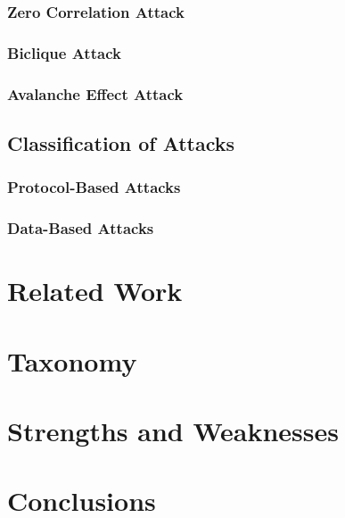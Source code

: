 \documentclass[conference,compsoc]{IEEEtran}
\begin{document}
\subsubsection{Zero Correlation Attack} 
\subsubsection{Biclique Attack} 
\subsubsection{Avalanche Effect Attack} 
\subsection{Classification of Attacks}
\subsubsection{Protocol-Based Attacks} 
\subsubsection{Data-Based Attacks} 

\section{Related Work}

\section{Taxonomy}

\section{Strengths and Weaknesses}

\section{Conclusions}



\end{document}
